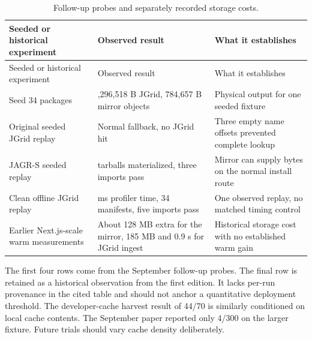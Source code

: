 \documentclass[
  11pt,
  letterpaper,
]{article}
\begin{document}
\begin{longtable}[]{@{}
  >{\raggedright\arraybackslash}p{}
  >{\raggedright\arraybackslash}p{}
  >{\raggedright\arraybackslash}p{}@{}}
\caption{Follow-up probes and separately recorded storage
costs.}\tabularnewline
\toprule\noalign{}
\begin{minipage}[b]{\linewidth}\raggedright
Seeded or historical experiment
\end{minipage} & \begin{minipage}[b]{\linewidth}\raggedright
Observed result
\end{minipage} & \begin{minipage}[b]{\linewidth}\raggedright
What it establishes
\end{minipage} \\
\midrule\noalign{}
\endfirsthead
\toprule\noalign{}
\begin{minipage}[b]{\linewidth}\raggedright
Seeded or historical experiment
\end{minipage} & \begin{minipage}[b]{\linewidth}\raggedright
Observed result
\end{minipage} & \begin{minipage}[b]{\linewidth}\raggedright
What it establishes
\end{minipage} \\
\midrule\noalign{}
\endhead
\bottomrule\noalign{}
\endlastfoot
Seed 34 packages & 4,296,518 B JGrid, 784,657 B mirror objects &
Physical output for one seeded fixture \\
Original seeded JGrid replay & Normal fallback, no JGrid hit & Three
empty name offsets prevented complete lookup \\
JAGR-S seeded replay & 34 tarballs materialized, three imports pass &
Mirror can supply bytes on the normal install route \\
Clean offline JGrid replay & 304 ms profiler time, 34 manifests, five
imports pass & One observed replay, no matched timing control \\
Earlier Next.js-scale warm measurements & About 128 MB extra for the
mirror, 185 MB and 0.9 s for JGrid ingest & Historical storage cost with
no established warm gain \\
\end{longtable}

The first four rows come from the September follow-up probes. The final
row is retained as a historical observation from the first edition. It
lacks per-run provenance in the cited table and should not anchor a
quantitative deployment threshold. The developer-cache harvest result of
44/70 is similarly conditioned on local cache contents. The September
paper reported only 4/300 on the larger fixture. Future trials should
vary cache density deliberately.
\end{document}
